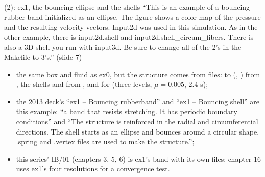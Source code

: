 \documentclass[aspectratio=169,11pt]{beamer}
\begin{document}
\begin{frame}{ (2): ex1, the bouncing ellipse and the shells}
\label{fr:ib1}
\footnotesize {} ``This is an example of a bouncing rubber band initialized as an ellipse. The figure shows a color map of the pressure and the resulting velocity vectors. Input2d was used in this simulation. As in the other example, there is input2d.shell and input2d.shell\_circum\_fibers. There is also a 3D shell you run with input3d. Be sure to change all of the 2's in the Makefile to 3's.'' (slide 7)
\begin{itemize}\scriptsize
  \item the same box and fluid as ex0, but the structure comes from files:  to  (, ) from , the shells  and  from , and  for  (three levels, $\mu = 0.005$, $2.4$ s);
  \item the 2013 deck's ``ex1 -- Bouncing rubberband'' and ``ex1 -- Bouncing shell'' are this example: ``a band that resists stretching. It has periodic boundary conditions'' and ``The structure is reinforced in the radial and circumferential directions. The shell starts as an ellipse and bounces around a circular shape. .spring and .vertex files are used to make the structure.'';
  \item this series' IB/01 (chapters 3, 5, 6) is ex1's band with its own files; chapter 16 uses ex1's four resolutions for a convergence test.
\end{itemize}
\end{frame}
\end{document}
